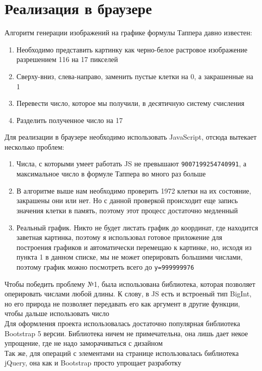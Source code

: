 \documentclass[a4paper,12pt]{article}
\begin{document}
\section{Реализация в браузере}
Алгоритм генерации изображений на графике формулы Таппера давно известен:
\begin{enumerate} 
  \item Необходимо представить картинку как черно-белое растровое изображение разрешением 116 на 17 пикселей
  \item Сверху-вниз, слева-направо, заменить пустые клетки на 0, а закрашенные на 1
  \item Перевести число, которое мы получили, в десятичную систему счисления
  \item Разделить полученное число на 17
\end{enumerate}

Для реализации в браузере необходимо использовать JavaScript, отсюда вытекает несколько проблем:
\begin{enumerate} 
  \item Числа, с которыми умеет работать JS не превышают \texttt{9007199254740991}, а максимальное число в формуле Таппера во много раз больше
  \item В алгоритме выше нам необходимо проверить 1972 клетки на их состояние, закрашены они или нет. Но с данной проверкой происходит еще запись значения клетки в память, поэтому этот процесс достаточно медленный
  \item Реальный график. Никто не будет листать график до координат, где находится заветная картинка, поэтому я использовал готовое приложение для построения графиков и автоматически перемещаю к картинке, но, исходя из пункта 1 в данном списке, мы не может оперировать большими числами, поэтому график можно посмотреть всего до \texttt{y=999999976}
\end{enumerate}

Чтобы победить проблему №1, была использована библиотека, которая позволяет оперировать числами любой длины. К слову, в JS есть и встроеный тип BigInt, но его природа не позволяет передавать его как аргумент в другие функции, чтобы дальше использовать число\\

Для оформления проекта использовалась достаточно популярная библиотека Bootstrap 5 версии. Библиотека ничем не примечательна, она лишь дает некое упрощение, где не надо заморачиваться с дизайном\\

Так же, для операций с элементами на странице использовалась библиотека jQuery, она как и Bootstrap просто упрощает разработку\\
\end{document}

